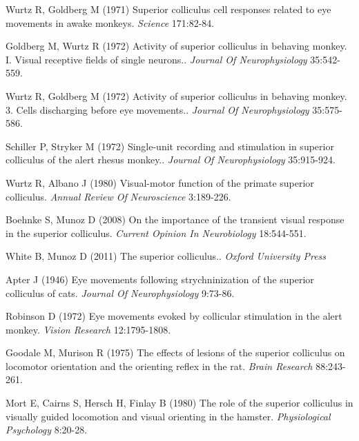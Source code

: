 \documentclass{ar-1col}
\begin{document}
{\begin{thebibliography}{00}
Wurtz R, Goldberg M (1971) 
Superior colliculus cell responses related to eye movements in awake monkeys.
\textit{ Science} 171:82-84.

Goldberg M, Wurtz R (1972) 
Activity of superior colliculus in behaving monkey. I. Visual receptive fields of single neurons..
\textit{ Journal Of Neurophysiology} 35:542-559.

Wurtz R, Goldberg M (1972) 
Activity of superior colliculus in behaving monkey. 3. Cells discharging before eye movements..
\textit{ Journal Of Neurophysiology} 35:575-586.

Schiller P, Stryker M (1972) 
Single-unit recording and stimulation in superior colliculus of the alert rhesus monkey..
\textit{ Journal Of Neurophysiology} 35:915-924.

Wurtz R, Albano J (1980) 
Visual-motor function of the primate superior colliculus.
\textit{ Annual Review Of Neuroscience} 3:189-226.

Boehnke S, Munoz D (2008) 
On the importance of the transient visual response in the superior colliculus.
\textit{ Current Opinion In Neurobiology} 18:544-551.

White B, Munoz D (2011) 
The superior colliculus..
\textit{ Oxford University Press}

Apter J (1946) 
Eye movements following strychninization of the superior colliculus of cats.
\textit{ Journal Of Neurophysiology} 9:73-86.

Robinson D (1972) 
Eye movements evoked by collicular stimulation in the alert monkey.
\textit{ Vision Research} 12:1795-1808.

Goodale M, Murison R (1975) 
The effects of lesions of the superior colliculus on locomotor orientation and the orienting reflex in the rat.
\textit{ Brain Research} 88:243-261.

Mort E, Cairns S, Hersch H, Finlay B (1980) 
The role of the superior colliculus in visually guided locomotion and visual orienting in the hamster.
\textit{ Physiological Psychology} 8:20-28.


\end{thebibliography}}
\end{document}
